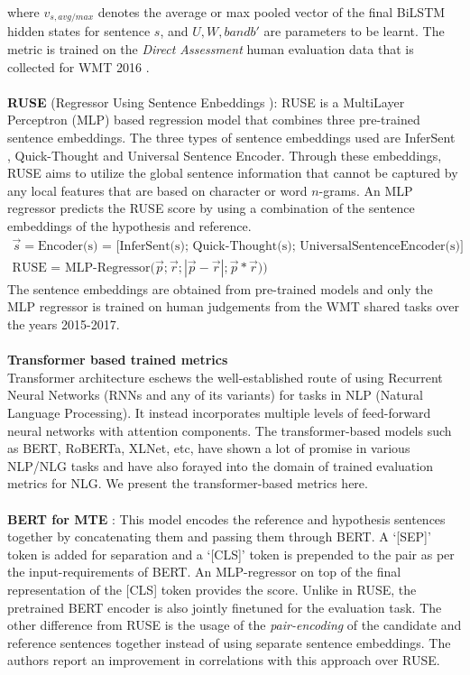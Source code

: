 where $v_{s,avg/max}$ denotes the average or max pooled vector of the final BiLSTM hidden states for sentence $s$, and $U, W, b and b'$ are parameters to be learnt. 
The metric is trained on the \textit{Direct Assessment} human evaluation data that is collected for WMT 2016 .\\
\\
\textbf{RUSE} (Regressor Using Sentence Enbeddings ): RUSE is a MultiLayer Perceptron (MLP) based regression model that combines three pre-trained sentence embeddings. The three types of sentence embeddings used are InferSent , Quick-Thought  and Universal Sentence Encoder. Through these embeddings, RUSE aims to utilize the global sentence information that cannot be captured by any local features that are based on character or word $n$-grams. An MLP regressor predicts the RUSE score by using a combination of the sentence embeddings of the hypothesis and reference.
\begin{gather*}
    \overrightarrow{s} = \text{Encoder(s) = [InferSent(s); Quick-Thought(s); UniversalSentenceEncoder(s)]}
    \\
    \text{RUSE = MLP-Regressor}\big( \overrightarrow{p};\overrightarrow{r};|\overrightarrow{p}-\overrightarrow{r}|;\overrightarrow{p}*\overrightarrow{r} ) \big)
\end{gather*}
The sentence embeddings are obtained from pre-trained models and only the MLP regressor is trained on human judgements from the WMT shared tasks over the years 2015-2017.\\ 
\\
\textbf{Transformer based trained metrics}\\
Transformer architecture  eschews the well-established route of using Recurrent Neural Networks (RNNs and any of its variants) for tasks in NLP (Natural Language Processing). It instead incorporates multiple levels of feed-forward neural networks with attention components. The transformer-based models such as BERT, RoBERTa, XLNet, etc, have shown a lot of promise in various NLP/NLG tasks and have also forayed into the domain of trained evaluation metrics for NLG. We present the transformer-based metrics here.\\
\\
\textbf{BERT for MTE}  : This model encodes the reference and hypothesis sentences together by concatenating them and passing them through BERT. A `[SEP]' token is added for separation and a `[CLS]' token is prepended to the pair as per the input-requirements of BERT. An MLP-regressor on top of the final representation of the [CLS] token provides the score. Unlike in RUSE, the pretrained BERT encoder is also jointly finetuned for the evaluation task. The other difference from RUSE is the usage of the \textit{pair-encoding} of the candidate and reference sentences together instead of using separate sentence embeddings. The authors report an improvement in correlations with this approach over RUSE.
